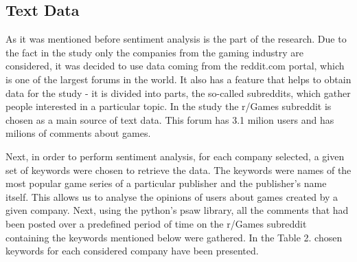 \documentclass[11pt]{article} %
\begin{document}
\subsection{Text Data}
As it was mentioned before sentiment analysis is the part of the research. Due to the fact in the study only the companies from the gaming industry are considered, it was decided to use data coming from the reddit.com portal, which is one of the largest forums in the world. It also has a feature that helps to obtain data for the study - it is divided into parts, the so-called subreddits, which gather people interested in a particular topic. In the study the r/Games subreddit is chosen as a main source of text data. This forum has 3.1 milion users and has milions of comments about games. 

Next, in order to perform sentiment analysis, for each company selected, a given set of keywords were chosen to retrieve the data. The keywords were names of the most popular game series of a particular publisher and the publisher's name itself. This allows us to analyse the opinions of users about games created by a given company. Next, using the python's psaw library,  all the comments that had been posted over a predefined period of time on the r/Games subreddit containing the keywords mentioned below were gathered. In the Table 2. chosen keywords for each considered company have been presented. 
\end{document}
